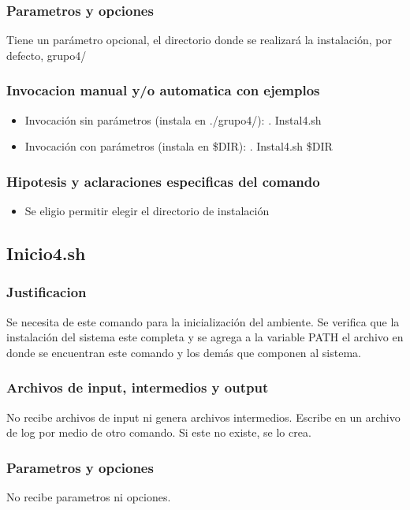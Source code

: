 \documentclass{article}
\begin{document}
		\subsubsection{Parametros y opciones}
		Tiene un parámetro opcional, el directorio donde se realizará la instalación, por defecto, grupo4/
		\subsubsection{Invocacion manual y/o automatica con ejemplos}
		\begin{itemize}
			\item Invocación sin parámetros (instala en ./grupo4/): . Instal4.sh
			\item Invocación con parámetros (instala en \$DIR): . Instal4.sh \$DIR
		\end{itemize}
		\subsubsection{Hipotesis y aclaraciones especificas del comando}
		\begin{itemize}
			\item Se eligio permitir elegir el directorio de instalación
		\end{itemize}
		
	\subsection{Inicio4.sh}
	
		\subsubsection{Justificacion}
		Se necesita de este comando para la inicialización del ambiente. Se verifica que la instalación del sistema este completa y se agrega a la variable PATH el archivo en donde se encuentran este comando y los demás que componen al sistema.
		\subsubsection{Archivos de input, intermedios y output}
		No recibe archivos de input ni genera archivos intermedios. Escribe en un archivo de log por medio de otro comando. Si este no existe, se lo crea.
		\subsubsection{Parametros y opciones}
		No recibe parametros ni opciones.
\end{document}
